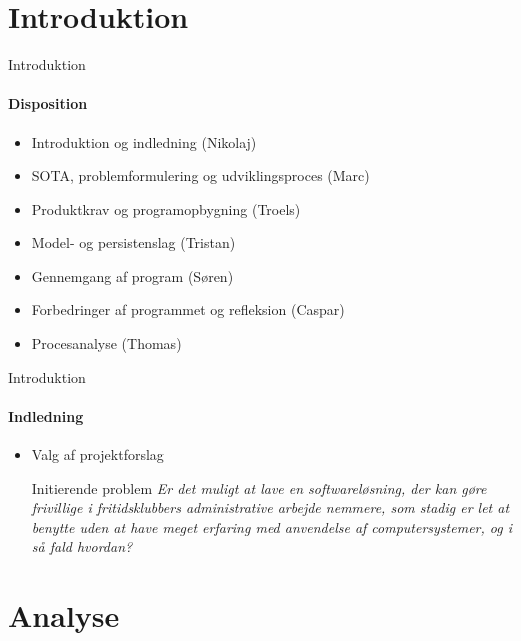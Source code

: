 \section{Introduktion}

\begin{frame}{Introduktion}
\framesubtitle{Disposition}

	\begin{itemize}
	\item Introduktion og indledning (Nikolaj)
	\item SOTA, problemformulering og udviklingsproces (Marc)
	\item Produktkrav og programopbygning (Troels)
	\item Model- og persistenslag (Tristan)
	\item Gennemgang af program (Søren)
	\item Forbedringer af programmet og refleksion (Caspar)
	\item Procesanalyse	(Thomas)
	\end{itemize}
\end{frame}


\begin{frame}{Introduktion}
\framesubtitle{Indledning}
	\begin{itemize}	
	\item Valg af projektforslag
	\newline
			
		\begin{beamerboxesrounded}[upper=headerCol,lower=bodyCol,shadow=true]{Initierende problem}
		\textit{Er det muligt at lave en softwareløsning, der kan gøre frivillige i fritidsklubbers administrative
		arbejde nemmere, som stadig er let at benytte uden at have meget erfaring med anvendelse af computersystemer, og i så fald hvordan?}
  		\end{beamerboxesrounded}
  		
	\end{itemize}
	
\end{frame}

\section{Analyse}
